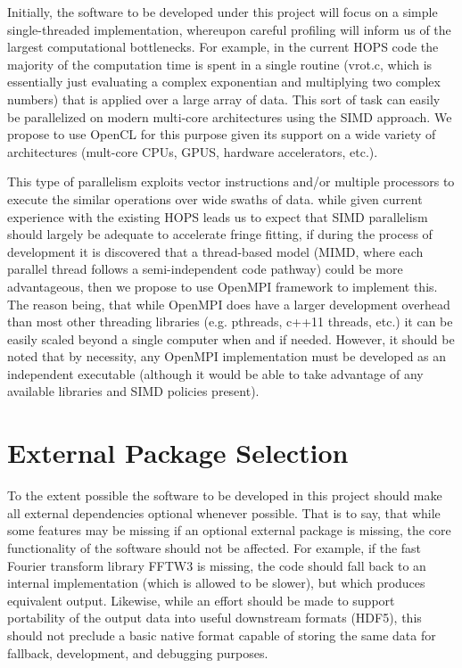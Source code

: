 \documentclass[hidelinks]{article}
\let\Oldsection\section
\renewcommand{\section}{\FloatBarrier\Oldsection}
\begin{document}
Initially, the software to be developed under this project will focus on a simple single-threaded implementation, whereupon careful
profiling will inform us of the largest computational bottlenecks. For example, in the current HOPS code the majority of
the computation time is spent in a single routine (vrot.c, which is essentially just evaluating a complex exponentian and multiplying two complex numbers) that is applied over
a large array of data. This sort of task can easily be parallelized on modern multi-core architectures using the SIMD approach. We propose to use OpenCL
for this purpose given its support on a wide variety of architectures (mult-core CPUs, GPUS, hardware accelerators, etc.).

This type of parallelism exploits vector instructions and/or multiple processors to execute the similar operations over wide swaths of data. while given current experience with the existing HOPS leads us to expect that SIMD parallelism should largely be adequate to accelerate fringe fitting, if during the process of development it is discovered that a thread-based model (MIMD, where each parallel thread follows a semi-independent code pathway) could be more advantageous, then we propose to use OpenMPI framework to implement this. The reason being, that while OpenMPI does have a larger development overhead than most other threading libraries (e.g. pthreads, c++11 threads, etc.) it can be easily scaled beyond a single computer when and if needed. However, it should be noted that by necessity, any OpenMPI implementation must be developed as an independent executable (although it would be able to take advantage of any available libraries and SIMD policies present). 


\section{External Package Selection}

To the extent possible the software to be developed in this project should make all external dependencies optional whenever possible. That is to say, that
while some features may be missing if an optional external package is missing, the core functionality of the software should not be affected. For example, if the fast Fourier transform library FFTW3 is missing, the code should fall back to an internal implementation (which is allowed to be slower), but which produces equivalent output. Likewise, while an effort should be made to support portability of the output data into useful downstream formats (HDF5), this should not preclude a
basic native format capable of storing the same data for fallback, development, and debugging purposes.
\end{document}
